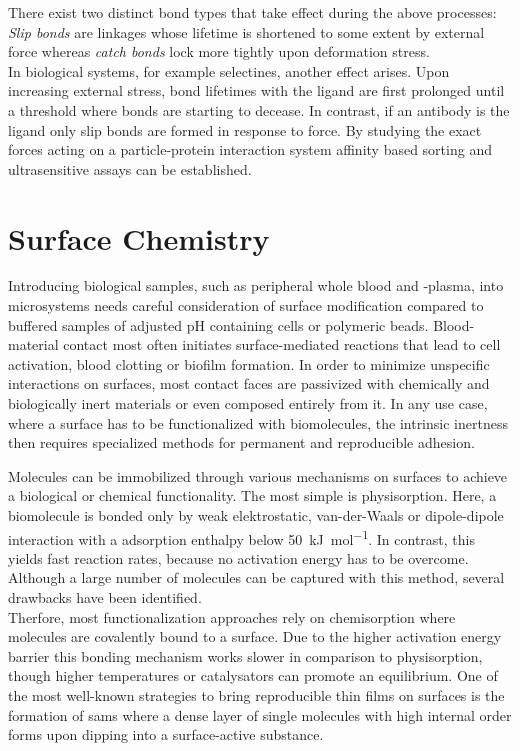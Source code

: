 There exist two distinct bond types that take effect during the above processes: \textit{Slip bonds} are linkages whose lifetime is shortened to some extent by external force whereas \textit{catch bonds} lock more tightly upon deformation stress. \\In biological systems, for example selectines, another effect arises. Upon increasing external stress, bond lifetimes with the ligand are first prolonged until a threshold where bonds are starting to decease.  In contrast, if an antibody is the ligand only slip bonds are formed in response to force.\cite{lit:bio:slip_bonds, lit:bio:catch_bonds} By studying the exact forces acting on a particle-protein interaction system affinity based sorting and ultrasensitive assays can be established.\cite{lit:bio:attomolarDetection}

\clearpage
\section{Surface Chemistry}
Introducing biological samples, such as peripheral whole blood and -plasma, into microsystems needs careful consideration of surface modification compared to buffered samples of adjusted pH containing cells or polymeric beads. Blood-material contact most often initiates surface-mediated reactions that lead to cell activation, blood clotting or biofilm formation.\cite{lit:bio:biomaterialInterfaces,lit:surf:microchannelEffectBlood} In order to minimize unspecific interactions on surfaces, most contact faces are passivized with chemically and biologically inert materials or even composed entirely from it. In any use case, where a surface has to be functionalized with biomolecules, the intrinsic inertness then requires specialized methods for permanent and reproducible adhesion.\cite{lit:chem:surface:methods,lit:surf:optimizedAdsorption}

Molecules can be immobilized through various mechanisms on surfaces to achieve a biological or chemical functionality. The most simple is physisorption. Here, a biomolecule is bonded only by weak elektrostatic, van-der-Waals or dipole-dipole interaction with a adsorption enthalpy below \SI{50}{\kilo\joule\per\mole}.\cite{lit:surf:optimizedAdsorption} In contrast, this yields fast reaction rates, because no activation energy has to be overcome. Although a large number of molecules can be captured with this method, several drawbacks have been identified.\cite{lit:bio:ImmobilizationTechniques, lit:bio:immobilization:UV-ABs,lit:bio:physisorp:desorption, lit:chem:surfModOptics} \\
Therfore, most functionalization approaches rely on chemisorption where molecules are covalently bound to a surface. Due to the higher activation energy barrier this bonding mechanism works slower in comparison to physisorption, though higher temperatures or catalysators can promote an equilibrium. One of the most well-known strategies to bring reproducible thin films on surfaces is the formation of \glspl{sam} where a dense layer of single molecules with high internal order forms upon dipping into a surface-active substance.\cite{lit:chem:sin:langeDiss}

